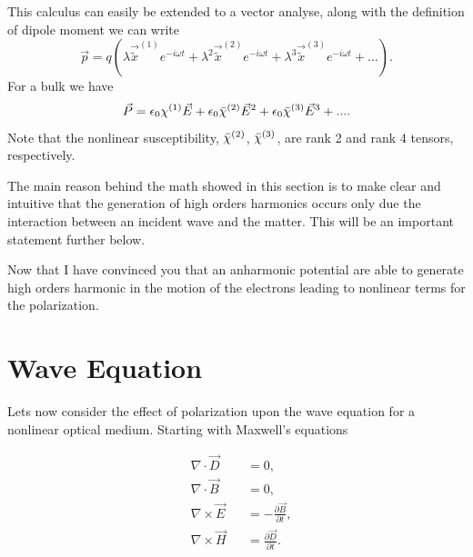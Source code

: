 This calculus can easily be extended to a vector analyse, along with the definition of dipole moment we can write
\begin{equation}
    \vec{p} = q\left(\lambda\vec{\tilde{x}}^{(1)}e^{-i\omega t}+\lambda^2\vec{\tilde{x}}^{(2)}e^{-i\omega t}+\lambda^3\vec{\tilde{x}}^{(3)}e^{-i\omega t}+... \right).
\end{equation}
For a bulk we have
\begin{equation}
    \vec{P} = \epsilon_0\chi^{(1)}\vec{E} + \epsilon_0\Bar{\chi}^{(2)}\vec{E}^2+\epsilon_0\Bar{\chi}^{(3)}\vec{E}^3+....
\label{eq:nonlim_pol}
\end{equation}
Note that the nonlinear susceptibility, $\Bar{\chi}^{(2)}$, $\Bar{\chi}^{(3)}$, are rank 2 and rank 4 tensors, respectively.

The main reason behind the math showed in this section is to make clear and intuitive that the generation of high orders harmonics occurs only due the interaction between an incident wave and the matter. This will be an important statement further below. 

Now that I have convinced you that an anharmonic potential are able to generate high orders harmonic in the motion of the electrons leading to nonlinear terms for the polarization.%

\section{Wave Equation}
\label{sec:wave_equation}

Lets now consider the effect of polarization upon the wave equation for a nonlinear optical medium. Starting with Maxwell's equations

\begin{subequations}
    \begin{alignat}{2}
        &\nabla\cdot\vec{D}  &&= 0,\\
        &\nabla\cdot\vec{B}  &&= 0,\\
        &\nabla\times\vec{E} &&= -\frac{\partial\vec{B}}{\partial t},\\ 
        &\nabla\times\vec{H} &&= \frac{\partial\vec{D}}{\partial t}.
    \end{alignat}
    \label{eq:max_eq}
\end{subequations}


